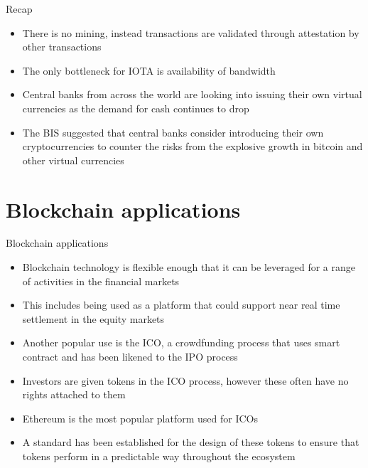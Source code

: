 \documentclass[9pt]{beamer}
\begin{document}

\begin{frame}{Recap}
	\begin{itemize}
		\item There is no mining, instead transactions are validated through attestation by other transactions
		\item The only bottleneck for IOTA is availability of bandwidth
		\item Central banks from across the world are looking into issuing their own virtual currencies as the demand for cash continues to drop
		\item The BIS suggested that central banks consider introducing their own cryptocurrencies to counter the risks from the explosive growth in bitcoin and other virtual currencies
	\end{itemize}
\end{frame}

\section{Blockchain applications}

\begin{frame}
	\begin{center}
		\begin{large}
			Blockchain applications
		\end{large}
	\end{center}
\end{frame}


\begin{frame}{}
	\begin{itemize}
		\item Blockchain technology is flexible enough that it can be leveraged for a range of activities in the financial markets
		\item This includes being used as a platform that could support near real time settlement in the equity markets
		\item Another popular use is the ICO, a crowdfunding process that uses smart contract and has been likened to the IPO process
		\item Investors are given tokens in the ICO process, however these often have no rights attached to them
		\item Ethereum is the most popular platform used for ICOs
		\item A standard has been established for the design of these tokens to ensure that tokens perform in a predictable way throughout the ecosystem
	\end{itemize}
\end{frame}
\end{document}
